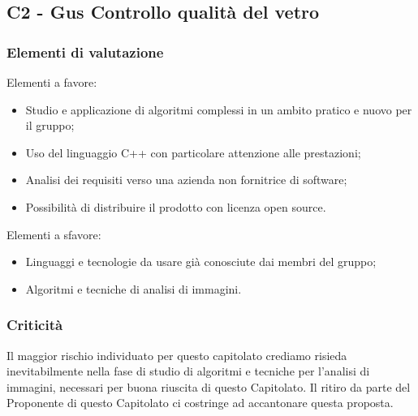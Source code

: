 \subsection{C2 - Gus Controllo qualità del vetro}{
	\subsubsection{Elementi di valutazione}{
		Elementi a favore:
		\begin{itemize}
			\item Studio e applicazione di algoritmi complessi in un ambito pratico e nuovo per il gruppo;
			\item Uso del linguaggio C++ con particolare attenzione alle prestazioni;
			\item Analisi dei requisiti verso una azienda non fornitrice di software;
			\item Possibilità di distribuire il prodotto con licenza open source.
		\end{itemize}
		
		Elementi a sfavore:
		\begin{itemize}
			\item Linguaggi e tecnologie da usare già conosciute dai membri del gruppo;
			\item Algoritmi e tecniche di analisi di immagini.
		\end{itemize}
	}
	\subsubsection{Criticità}{
		Il maggior rischio individuato per questo capitolato crediamo risieda inevitabilmente nella fase di studio di algoritmi e tecniche per l'analisi di immagini, necessari per buona riuscita di questo Capitolato.
		Il ritiro da parte del Proponente di questo Capitolato ci costringe ad accantonare questa proposta.
	}
}
